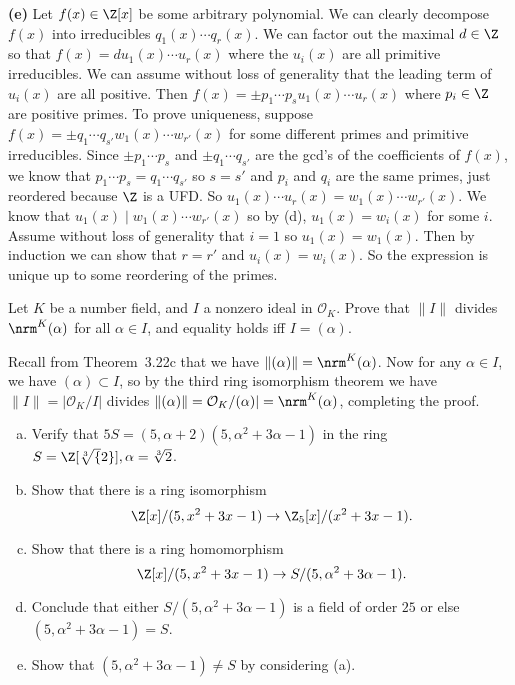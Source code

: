 \documentclass[11pt,letterpaper]{article}
\begin{document}
\begin{solution}
    \textbf{(e)} Let $f(x)\in \Z[x]$ be some arbitrary polynomial. We can clearly decompose $f(x)$ into irreducibles $q_1(x)\cdots q_r(x)$. We can factor out the maximal $d\in \Z$ so that $f(x)=du_1(x)\cdots u_r(x)$ where the $u_i(x)$ are all primitive irreducibles. We can assume without loss of generality that the leading term of $u_i(x)$ are all positive. Then $f(x)=\pm p_1\cdots p_su_1(x)\cdots u_r(x)$ where $p_i\in \Z$ are positive primes. To prove uniqueness, suppose $f(x)=\pm q_1\cdots q_{s'} w_1(x)\cdots w_{r'}(x)$ for some different primes and primitive irreducibles. Since $\pm p_1\cdots p_s$ and $\pm q_1\cdots q_{s'}$ are the gcd's of the coefficients of $f(x)$, we know that $p_1\cdots p_s=q_1\cdots q_{s'}$ so $s=s'$ and $p_i$ and $q_i$ are the same primes, just reordered because $\Z$ is a UFD. So $u_1(x)\cdots u_r(x)=w_1(x)\cdots w_{r'}(x)$. We know that $u_1(x)\mid w_1(x)\cdots w_{r'}(x)$ so by (d), $u_1(x)=w_i(x)$ for some $i$. Assume without loss of generality that $i=1$ so $u_1(x)=w_1(x)$. Then by induction we can show that $r=r'$ and $u_i(x)=w_i(x)$. So the expression is unique up to some reordering of the primes.    
\end{solution}

\begin{cproblem}{3.11}
    Let $K$ be a number field, and $I$ a nonzero ideal in $\mathcal{O}_K$. Prove that $\|I\|$ divides $\nrm^K(\alpha)$ for all $\alpha\in I$, and equality holds iff $I=(\alpha)$. 
\end{cproblem}

\begin{solution}
    Recall from Theorem~3.22c that we have $\|(\alpha)\|=\nrm^K(\alpha)$. Now for any $\alpha\in I$, we have $(\alpha)\subset I$, so by the third ring isomorphism theorem we have $\|I\|=|\mathcal{O}_K /I|$ divides $\|(\alpha)\|=\mathcal{O}_K /(\alpha)|=\nrm^K(\alpha)$, completing the proof. 
\end{solution}

\begin{cproblem}{3.12}\noindent
    \begin{enumerate}[(a)]
        \item Verify that $5S=(5,\alpha+2)(5,\alpha^2+3\alpha-1)$ in the ring $S=\Z[\sqrt[3]{2}], \alpha=\sqrt[3]{2}$.
        \item Show that there is a ring isomorphism
        \[
            \Z[x]/(5,x^2+3x-1) \to \Z_5[x]/(x^2+3x-1)    
        .\] 
        \item Show that there is a ring homomorphism
        \[
            \Z[x]/(5,x^2+3x-1) \to S/(5,\alpha^2+3\alpha-1)
        .\] 
        \item Conclude that either $S /(5,\alpha^2+3\alpha-1)$ is a field of order $25$ or else $(5,\alpha^2+3\alpha-1)=S$.
        \item Show that $(5,\alpha^2+3\alpha-1)\neq S$ by considering (a). 
    \end{enumerate}
\end{cproblem}
\end{document}
